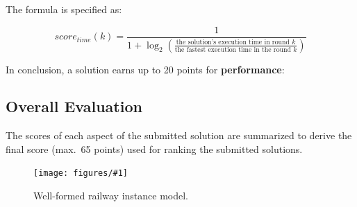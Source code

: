 \documentclass[submission,copyright,creativecommons]{eptcs}
\newcommand{\ttcfig}[2]{
\begin{figure}[htb] 
	\centering
	\texttt{[image: figures/\#1]}
	\caption{#2.}
	\vspace{-1em}
	\label{fig:#1}
\end{figure}}
\begin{document}
\begin{itemize}
	The formula is specified as:
	
	\[ \mathit{score}_\mathit{time}(k)=\frac{1}{1+\log_2\left(\frac{\text{the solution's execution time in round $k$}}{\text{the fastest execution time in the round $k$}}\right)} \]
\end{itemize}

In conclusion, a solution earns up to 20 points for \textbf{performance}:

\noindent{}

\subsection{Overall Evaluation}

The scores of each aspect of the submitted solution are summarized to derive the final score (max.\ 65 points) used for ranking the submitted solutions.



\ttcfig{railway-yed}{Well-formed railway instance model}
\end{document}
